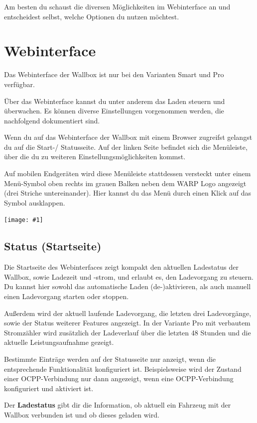 \documentclass[a4paper,10pt]{article}
\newcommand{\gfx}[1]{\texttt{[image: \#1]}}
\begin{document}
\begin{multicols*}{2}
	Am besten du schaust die diversen Möglichkeiten im Webinterface an und
	entscheidest selbst, welche Optionen du nutzen möchtest.

	\section{Webinterface}\label{webinterface}
	Das Webinterface der Wallbox ist nur bei den Varianten Smart und Pro verfügbar.

	Über das Webinterface kannst du unter anderem das Laden steuern und überwachen.
	Es können diverse Einstellungen vorgenommen werden, die nachfolgend
	dokumentiert sind.

	Wenn du auf das Webinterface der Wallbox mit einem Browser zugreifst
	gelangst du auf die Start-/ Statusseite. Auf der linken Seite befindet sich
	die Menüleiste, über die du zu weiteren Einstellungsmöglichkeiten kommst.

	Auf mobilen Endgeräten wird
	diese Menüleiste stattdessen versteckt unter einem Menü-Symbol oben rechts
	im grauen Balken neben dem WARP Logo angezeigt (\glqq drei Striche untereinander\grqq).
	Hier kannst du das Menü durch einen Klick auf das Symbol ausklappen.

	\gfx{./img_warp2/resized/web_status}

	\subsection{Status (Startseite)}

	Die Startseite des Webinterfaces zeigt kompakt den aktuellen Ladestatus der
	Wallbox, sowie Ladezeit und -strom, und erlaubt es, den Ladevorgang zu steuern.
	Du kannst hier sowohl das automatische Laden (de-)aktivieren, als auch
	manuell einen Ladevorgang starten oder stoppen.

	Außerdem wird der aktuell laufende Ladevorgang, die letzten drei
	Ladevorgänge, sowie der Status weiterer Features angezeigt.
	In der Variante Pro mit verbautem Stromzähler wird zusätzlich der Ladeverlauf
	über die letzten 48 Stunden und die aktuelle Leistungsaufnahme gezeigt.

	Bestimmte Einträge werden auf der Statusseite nur anzeigt, wenn die entsprechende
	Funktionalität konfiguriert ist. Beispielsweise wird der Zustand einer OCPP-Verbindung
	nur dann angezeigt, wenn eine OCPP-Verbindung konfiguriert und aktiviert ist.

	Der \textbf{Ladestatus} gibt dir die Information, ob aktuell ein
	Fahrzeug mit der Wallbox verbunden ist und ob dieses geladen wird.


\end{multicols*}
\end{document}
